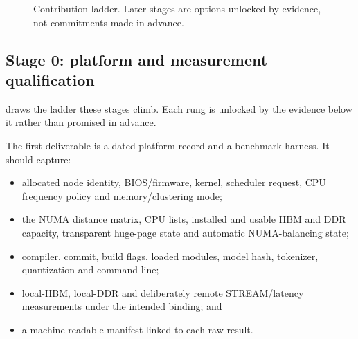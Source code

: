 \begin{figure}[htbp]
\centering
{}
\caption{Contribution ladder.  Later stages are options unlocked by
evidence, not commitments made in advance.}
\label{fig:programme}
\end{figure}

\subsection{Stage 0: platform and measurement qualification}

 draws the ladder these stages climb.  Each rung
is unlocked by the evidence below it rather than promised in advance.

The first deliverable is a dated platform record and a benchmark
harness.  It should capture:

\begin{itemize}
  \item allocated node identity, BIOS/firmware, kernel, scheduler
        request, CPU frequency policy and memory/clustering mode;
  \item the NUMA distance matrix, CPU lists, installed and usable HBM
        and DDR capacity, transparent huge-page state and automatic
        NUMA-balancing state;
  \item compiler, \lcpp{} commit, build flags, loaded modules, model
        hash, tokenizer, quantization and command line;
  \item local-HBM, local-DDR and deliberately remote STREAM/latency
        measurements under the intended binding; and
  \item a machine-readable manifest linked to each raw result.
\end{itemize}

